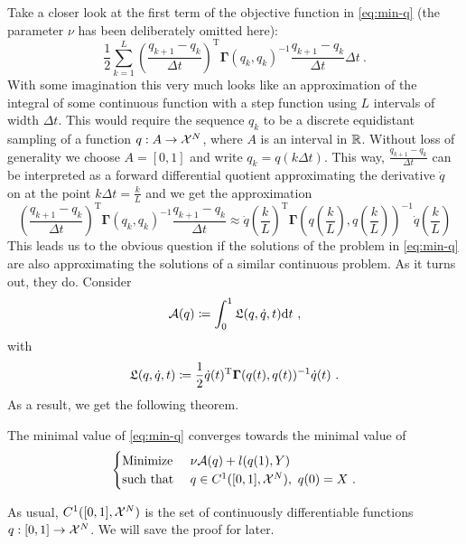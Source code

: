 Take a closer look at the first term of the objective function in \cref{eq:min-q} (the parameter $\nu$ has been deliberately omitted here):
\begin{equation}
	\label{eq:discrete-lagrangian}
	\frac{1}{2} \sum_{k=1}^{L} \left(\frac{q_{k+1} - q_k}{\Delta t}\right)^\mathrm{T} \mathbf{\Gamma}(q_k, q_k)^{-1} \frac{q_{k+1} - q_k}{\Delta t} \Delta t \ .
\end{equation}
With some imagination this very much looks like an approximation of the integral of some continuous function with a step function using $L$ intervals of width $\Delta t$.
This would require the sequence $q_k$ to be a discrete equidistant sampling of a function $q: A \rightarrow \mathcal{X}^N$, where $A$ is an interval in $\mathbb{R}$.
Without loss of generality we choose $A = [0, 1]$ and write $q_k = q(k \Delta t)$.
This way, $\frac{q_{k+1} - q_k}{\Delta t}$ can be interpreted as a forward differential quotient approximating the derivative $\dot{q}$ on at the point $k \Delta t = \frac{k}{L}$ and we get the approximation
\begin{equation}
	\left(\frac{q_{k+1} - q_k}{\Delta t}\right)^\mathrm{T} \mathbf{\Gamma}(q_k, q_k)^{-1} \frac{q_{k+1} - q_k}{\Delta t} 
	\approx \dot{q}\left(\frac{k}{L}\right)^\mathrm{T} \mathbf{\Gamma}\left(q\left(\frac{k}{L}\right), q\left(\frac{k}{L}\right)\right)^{-1}\dot{q}\left(\frac{k}{L}\right)
\end{equation}
This leads us to the obvious question if the solutions of the problem in \cref{eq:min-q} are also approximating the solutions of a similar continuous problem.
As it turns out, they do.
Consider 
\begin{equation}
\label{eq:action}
	\mathcal{A}(q) \coloneqq \int_{0}^{1} \mathfrak{L}(q, \dot{q}, t) \mathrm{d}t \ ,
\end{equation}
with
\begin{equation}
\label{eq:lagrangian}
	\mathfrak{L}(q, \dot{q}, t) \coloneqq \frac{1}{2} \dot{q}(t)^\mathrm{T} \mathbf{\Gamma}(q(t), q(t))^{-1} \dot{q}(t) \ .
\end{equation}
As a result, we get the following theorem.
\begin{theorem}
	The minimal value of \cref{eq:min-q} converges towards the minimal value of             
	\begin{equation}
	\label{eq:cont-least-action}
		\begin{cases}
			\text{Minimize~} & \nu \mathcal{A}(q) + l(q(1), Y)\\
			\text{such that~} & q \in C^1([0,1], \cX^N),\ q(0) = X \ .
		\end{cases}
	\end{equation}
\end{theorem}
As usual, $C^1([0,1], \mathcal{X}^N)$ is the set of continuously differentiable functions $q: [0, 1] \rightarrow \mathcal{X}^N$.
We will save the proof for later.

